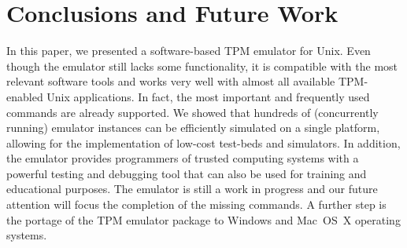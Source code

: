 \documentclass[runningheads]{llncs}
\begin{document}

\section{Conclusions and Future Work}
In this paper, we presented a software-based TPM emulator for Unix. Even
though the emulator still lacks some functionality, it is compatible with
the most relevant software tools and works very well with almost all
available TPM-enabled Unix applications. In fact, the most important and
frequently used commands are already supported. We showed that hundreds of
(concurrently running) emulator instances can be efficiently simulated on
a single platform, allowing for the implementation of low-cost test-beds
and simulators. In addition, the emulator provides programmers of trusted
computing systems with a powerful testing and debugging tool that can also
be used for training and educational purposes.
The emulator is still a work in progress and our future attention will
focus the completion of the missing commands. A further step is the portage
of the TPM emulator package to Windows and Mac~OS~X operating systems.

\end{document}
